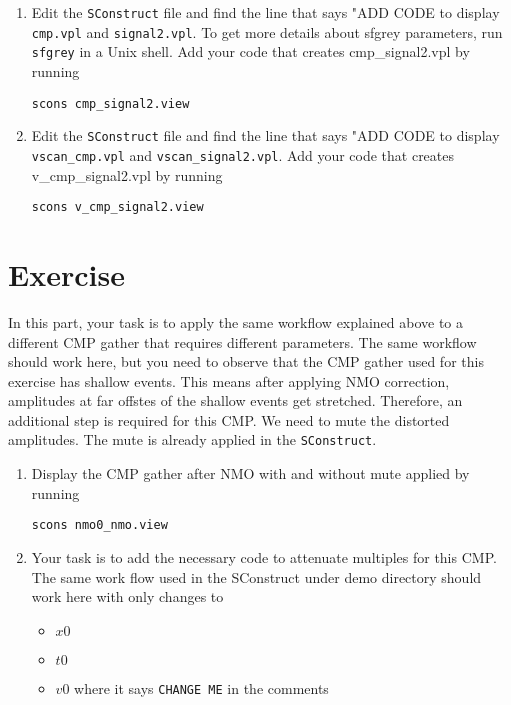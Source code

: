 \begin{enumerate}
\item Edit the \texttt{SConstruct} file and find the line that says "ADD CODE to display \texttt{cmp.vpl} and \texttt{signal2.vpl}. To get more details about sfgrey parameters, run \texttt{sfgrey} in a Unix shell. Add your code that creates cmp_signal2.vpl by running
\begin{verbatim}
scons cmp_signal2.view
\end{verbatim}

\item Edit the \texttt{SConstruct} file and find the line that says "ADD CODE to display \texttt{vscan_cmp.vpl} and \texttt{vscan_signal2.vpl}. Add your code that creates v_cmp_signal2.vpl by running
\begin{verbatim}
scons v_cmp_signal2.view
\end{verbatim}


\end{enumerate}

\lstset{language=python,numbers=left,numberstyle=\tiny,showstringspaces=false}


\section{Exercise}

In this part, your task is to apply the same workflow explained above to a different CMP gather that requires different parameters. The same workflow should work here, but you need to observe that the CMP gather used for this exercise has shallow events. This means after applying NMO correction, amplitudes at far offstes of the shallow events get stretched. Therefore, an additional step is required for this CMP. We need to mute the distorted amplitudes. The mute is already applied in the \texttt{SConstruct}. 
\begin{enumerate}

\item Display the CMP gather after NMO with and without mute applied by running 
\begin{verbatim}
scons nmo0_nmo.view
\end{verbatim}

\item Your task is to add the necessary code to attenuate multiples for this CMP.
The same work flow used in the SConstruct under demo directory should work here with only changes to 
\begin{itemize}
\item $x0$
\item $t0$
\item $v0$
where it says \texttt{CHANGE ME} in the comments
\end{itemize}

\end{enumerate}

